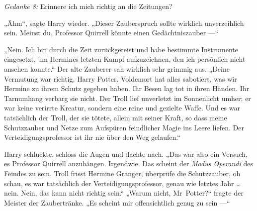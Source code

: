\emph{Gedanke 8:} Erinnere ich mich richtig an die Zeitungen?

„Ähm“, sagte Harry wieder.
„Dieser Zauberspruch sollte wirklich unverzeihlich sein. Meinst du, Professor Quirrell könnte einen Gedächtniszauber —“

„Nein. Ich bin durch die Zeit zurückgereist und habe bestimmte Instrumente eingesetzt, um Hermines letzten Kampf aufzuzeichnen, den ich persönlich nicht ansehen konnte.“ Der alte Zauberer sah wirklich sehr grimmig aus.
„Deine Vermutung war richtig, Harry Potter. Voldemort hat alles sabotiert, was wir Hermine zu ihrem Schutz gegeben haben. Ihr Besen lag tot in ihren Händen. Ihr Tarnumhang verbarg sie nicht. Der Troll lief unverletzt im Sonnenlicht umher; er war keine verirrte Kreatur, sondern eine reine und gezielte Waffe. Und es war tatsächlich der Troll, der sie tötete, allein mit seiner Kraft, so dass meine Schutzzauber und Netze zum Aufspüren feindlicher Magie ins Leere liefen. Der Verteidigungsprofessor ist ihr nie über den Weg gelaufen.“

Harry schluckte, schloss die Augen und dachte nach.
„Das war also ein Versuch, es Professor Quirrell anzuhängen. Irgendwie. Das scheint der \emph{Modus Operandi} des Feindes zu sein. Troll frisst Hermine Granger, überprüfe die Schutzzauber, oh schau, es war tatsächlich der Verteidigungsprofessor, genau wie letztes Jahr … nein. Nein, das kann nicht richtig sein.“
„Warum nicht, Mr~Potter?“ fragte der Meister der Zaubertränke.
„Es scheint mir offensichtlich genug zu sein —“

